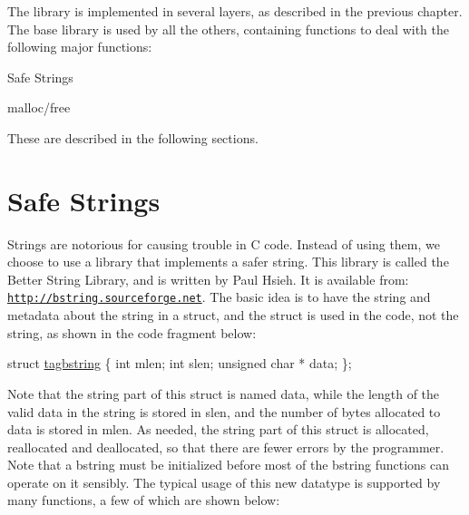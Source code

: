 
The library is implemented in several layers, as described in the previous chapter. The base library is used by all the others, containing functions to deal with the following major functions\+: \begin{DoxyItemize}
\item Safe Strings \item malloc/free\end{DoxyItemize}
These are described in the following sections.\hypertarget{base_library_base_safe_strings}{}\section{Safe Strings}\label{base_library_base_safe_strings}

Strings are notorious for causing trouble in C code. Instead of using them, we choose to use a library that implements a safer string. This library is called the Better String Library, and is written by Paul Hsieh. It is available from\+: \href{http://bstring.sourceforge.net}{\tt http\+://bstring.\+sourceforge.\+net}. The basic idea is to have the string and metadata about the string in a {\ttfamily struct}, and the {\ttfamily struct} is used in the code, not the string, as shown in the code fragment below\+: 
\begin{DoxyCode}
\textcolor{keyword}{struct }\hyperlink{structtagbstring}{tagbstring} \{
    \textcolor{keywordtype}{int} mlen;
    \textcolor{keywordtype}{int} slen;
    \textcolor{keywordtype}{unsigned} \textcolor{keywordtype}{char} * data;
\};
\end{DoxyCode}
 Note that the string part of this {\ttfamily struct} is named {\ttfamily data}, while the length of the valid data in the string is stored in {\ttfamily slen}, and the number of bytes allocated to data is stored in {\ttfamily mlen}. As needed, the string part of this struct is allocated, reallocated and deallocated, so that there are fewer errors by the programmer. Note that a {\ttfamily bstring} must be initialized before most of the {\ttfamily bstring} functions can operate on it sensibly. The typical usage of this new datatype is supported by many functions, a few of which are shown below\+:

